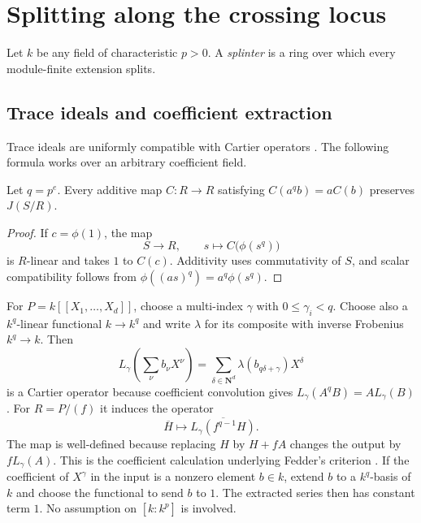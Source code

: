 \section{Splitting along the crossing locus}\label{geometry}
Let $k$ be any field of characteristic $p>0$. A \emph{splinter} is a ring over which every module-finite extension splits.
\subsection{Trace ideals and coefficient extraction}
Trace ideals are uniformly compatible with Cartier operators \cite{DT2023,PS2023}. The following formula works over an arbitrary coefficient field.
\begin{lemma}\label{cartier-trace}
Let $q=p^e$.  Every additive map $C:R\to R$ satisfying
$C(a^qb)=aC(b)$ preserves $J(S/R)$.
\end{lemma}
\begin{proof}
If $c=\phi(1)$, the map
\[
 S\longrightarrow R,\qquad s\longmapsto C\bigl(\phi(s^q)\bigr)
\]
is $R$-linear and takes $1$ to $C(c)$.  Additivity uses commutativity of
$S$, and scalar compatibility follows from
$\phi((as)^q)=a^q\phi(s^q)$.
\end{proof}

For $P=k[[X_1,\ldots,X_d]]$, choose a multi-index $\gamma$ with
$0\le\gamma_i<q$.  Choose also a $k^q$-linear functional $k\to k^q$ and
write $\lambda$ for its composite with inverse Frobenius $k^q\to k$.  Then
\[
 L_\gamma\!\left(\sum_\nu b_\nu X^\nu\right)
   =\sum_{\delta\in\mathbf N^d}
       \lambda(b_{q\delta+\gamma})X^\delta
\]
is a Cartier operator because coefficient convolution gives
$L_\gamma(A^qB)=A L_\gamma(B)$.
For $R=P/(f)$ it induces the operator
\[
 \overline H\longmapsto
 \overline{L_\gamma(f^{q-1}H)}.
\]
The map is well-defined because replacing $H$ by $H+fA$ changes the
output by $fL_\gamma(A)$.  This is the coefficient calculation underlying
Fedder's criterion \cite{Fed}.  If the coefficient of $X^\gamma$ in the
input is a nonzero element $b\in k$, extend $b$ to a $k^q$-basis of $k$
and choose the functional to send $b$ to $1$.  The extracted series then
has constant term $1$.  No assumption on $[k:k^p]$ is involved.

